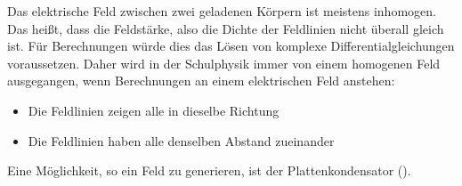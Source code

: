 Das elektrische Feld zwischen zwei geladenen Körpern ist meistens inhomogen. Das heißt, dass die Feldstärke, also die Dichte der Feldlinien nicht überall gleich ist. Für Berechnungen würde dies das Lösen von komplexe Differentialgleichungen voraussetzen. Daher wird in der Schulphysik immer von einem homogenen Feld ausgegangen, wenn Berechnungen an einem elektrischen Feld anstehen:

\begin{itemize}
	\item Die Feldlinien zeigen alle in dieselbe Richtung
	\item Die Feldlinien haben alle denselben Abstand zueinander
\end{itemize} 

Eine Möglichkeit, so ein Feld zu generieren, ist der Plattenkondensator ().









